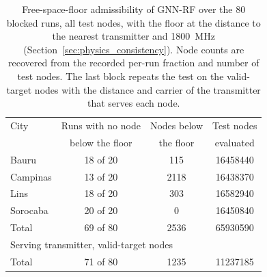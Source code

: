 \begin{table}[!t]
\centering
\caption{Free-space-floor admissibility of GNN-RF over the 80 blocked runs, all test nodes, with the floor at the distance to the nearest transmitter and 1800~MHz (Section~\ref{sec:physics_consistency}). Node counts are recovered from the recorded per-run fraction and number of test nodes. The last block repeats the test on the valid-target nodes with the distance and carrier of the transmitter that serves each node.}
\label{tab:physics_compliance}
\setlength{\tabcolsep}{4pt}
\begin{tabular}{lccc}
\toprule
City & Runs with no node & Nodes below & Test nodes \\
 & below the floor & the floor & evaluated \\
\midrule
Bauru & 18 of 20 & \num{115} & \num{16458440} \\
Campinas & 13 of 20 & \num{2118} & \num{16438370} \\
Lins & 18 of 20 & \num{303} & \num{16582940} \\
Sorocaba & 20 of 20 & \num{0} & \num{16450840} \\
\midrule
Total & 69 of 80 & \num{2536} & \num{65930590} \\
\midrule
\multicolumn{4}{l}{Serving transmitter, valid-target nodes} \\
Total & 71 of 80 & \num{1235} & \num{11237185} \\
\bottomrule
\end{tabular}
\end{table}
